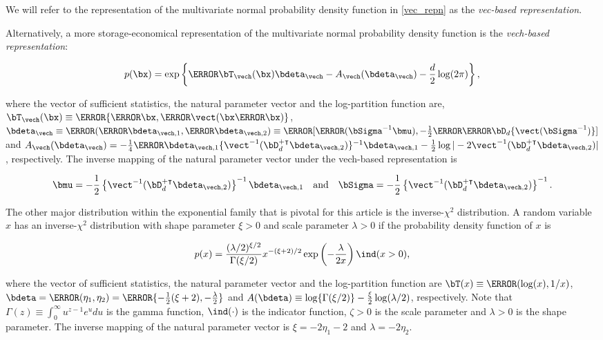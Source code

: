 \documentclass[ba]{imsart}
\numberwithin{equation}{section}
\theoremstyle{plain}
\begin{document}
\noindent We will refer to the representation of the multivariate normal probability density function in
\eqref{vec_repn} as the \emph{vec-based representation}.

Alternatively, a more storage-economical
representation of the multivariate normal probability density function is the \emph{vech-based representation}:

\[
	p (\bx) = \exp \left\{ \T{\bT_{\vech} (\bx)} \bdeta_{\vech} - A_{\vech} (\bdeta_{\vech}) - \frac{d}{2} \log (2 \pi) \right\},
\]

\noindent where the vector of sufficient statistics, the natural parameter vector and the log-partition function are,
$\bT_{\vech} (\bx) \equiv \T{\{ \T{\bx}, \T{\vect ( \bx \T{\bx} )} \}}$,
$\bdeta_{\vech} \equiv \T{( \T{\bdeta_{\vech, 1}}, \T{\bdeta_{\vech, 2}} )} \equiv \T{[ \T{( \bSigma^{-1} \bmu )}, \allowbreak
-\frac12 \T{ \T{\bD_d} \{ \vect (\bSigma^{-1}) \}} ]}$ and
$A_{\vech} (\bdeta_{\vech}) = -\frac14 \T{\bdeta}_{\vech, 1} \{ \vect^{-1} (\bD_d^{+ \intercal} \bdeta_{\vech, 2}) \}^{-1}
\bdeta_{\vech, 1} - \frac12 \log | -2 \vect^{-1} (\bD_d^{+ \intercal} \bdeta_{\vech, 2}) |$, respectively.
The inverse mapping of the natural parameter vector under the vech-based representation is

\begin{equation}
	\bmu = -\frac12 \left\{ \vect^{-1} (\bD_d^{+ \intercal}\bdeta_{\vech, 2}) \right\}^{-1} \bdeta_{\vech, 1} \quad
	\text{and} \quad
	\bSigma = -\frac12 \left\{ \vect^{-1} (\bD_d^{+ \intercal}\bdeta_{\vech, 2}) \right\}^{-1}.
\label{gauss_vech_comm_params}
\end{equation}

The other major distribution within the exponential family that is pivotal for this article is the inverse-$\chi^2$ distribution.
A random variable $x$ has an inverse-$\chi^2$ distribution with shape parameter $\xi > 0$ and scale parameter
$\lambda > 0$ if the probability density function of $x$ is

\[
	p(x) = 
		\frac{(\lambda/2)^{\xi/2}}{\Gamma (\xi/2)}
		x^{-(\xi + 2)/2} \exp \left( -\frac{\lambda}{2 x} \right) \ind (x > 0),
\]

\noindent where the vector of sufficient statistics, the natural parameter vector and the log-partition function are
$\bT (x) \equiv \T{( \log (x), 1/x )}$, $\bdeta = \T{(\eta_1, \eta_2)} = \T{\{-\frac12 (\xi + 2), -\frac{\lambda}{2} \}}$
and $A(\bdeta) \equiv \log \{ \Gamma (\xi/2) \} - \frac{\xi}{2} \log (\lambda/2)$, respectively. Note that
$\Gamma (z) \equiv \int_0^\infty u^{z - 1} e^u du$ is the gamma function,
$\ind (\cdot)$ is the indicator function, $\zeta > 0$ is the scale parameter and $\lambda > 0$ is the shape parameter.
The inverse mapping of the natural parameter vector is
$\xi = -2 \eta_1 - 2$ and $\lambda = -2 \eta_2$.
\end{document}
